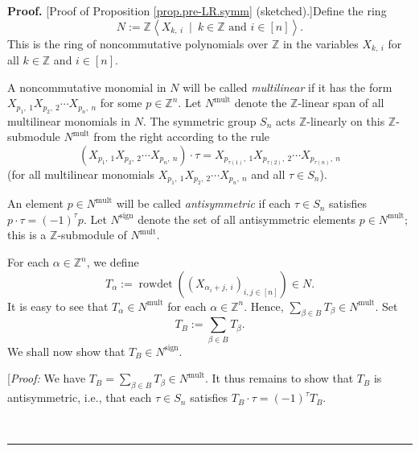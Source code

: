 \documentclass
[numbers=enddot,12pt,final,onecolumn,notitlepage,english]{scrartcl}%
\theoremstyle{definition}
\newenvironment{proof}[1][Proof]{\noindent\textbf{#1.} }{\ \rule{0.5em}{0.5em}}
\let\sumnonlimits\sum
\renewcommand{\sum}{\sumnonlimits\limits}
\begin{document}
\begin{proof}
[Proof of Proposition \ref{prop.pre-LR.symm} (sketched).]Define the ring%
\[
N:=\mathbb{Z}\left\langle X_{k,\ i}\ \mid\ k\in\mathbb{Z}\text{ and }%
i\in\left[  n\right]  \right\rangle .
\]
This is the ring of noncommutative polynomials over $\mathbb{Z}$ in the
variables $X_{k,\ i}$ for all $k\in\mathbb{Z}$ and $i\in\left[  n\right]  $.

A noncommutative monomial in $N$ will be called \emph{multilinear} if it has
the form $X_{p_{1},\ 1}X_{p_{2},\ 2}\cdots X_{p_{n},\ n}$ for some
$p\in\mathbb{Z}^{n}$. Let $N^{\operatorname*{mult}}$ denote the $\mathbb{Z}%
$-linear span of all multilinear monomials in $N$. The symmetric group $S_{n}$
acts $\mathbb{Z}$-linearly on this $\mathbb{Z}$-submodule
$N^{\operatorname*{mult}}$ from the right according to the rule%
\begin{equation}
\left(  X_{p_{1},\ 1}X_{p_{2},\ 2}\cdots X_{p_{n},\ n}\right)  \cdot
\tau=X_{p_{\tau\left(  1\right)  },\ 1}X_{p_{\tau\left(  2\right)  }%
,\ 2}\cdots X_{p_{\tau\left(  n\right)  },\ n}
\label{pf.prop.pre-LR.symm.mon-acn}%
\end{equation}
(for all multilinear monomials $X_{p_{1},\ 1}X_{p_{2},\ 2}\cdots X_{p_{n}%
,\ n}$ and all $\tau\in S_{n}$).

An element $p\in N^{\operatorname*{mult}}$ will be called \emph{antisymmetric}
if each $\tau\in S_{n}$ satisfies $p\cdot\tau=\left(  -1\right)  ^{\tau}p$.
Let $N^{\operatorname*{sign}}$ denote the set of all antisymmetric elements
$p\in N^{\operatorname*{mult}}$; this is a $\mathbb{Z}$-submodule of
$N^{\operatorname*{mult}}$.

For each $\alpha\in\mathbb{Z}^{n}$, we define%
\[
T_{\alpha}:=\operatorname*{rowdet}\left(  \left(  X_{\alpha_{i}+j,\ i}\right)
_{i,j\in\left[  n\right]  }\right)  \in N.
\]
It is easy to see that $T_{\alpha}\in N^{\operatorname*{mult}}$ for each
$\alpha\in\mathbb{Z}^{n}$. Hence, $\sum_{\beta\in B}T_{\beta}\in
N^{\operatorname*{mult}}$. Set%
\begin{equation}
T_{B}:=\sum_{\beta\in B}T_{\beta}. \label{pf.prop.pre-LR.symm.TB=}%
\end{equation}
We shall now show that $T_{B}\in N^{\operatorname*{sign}}$.

[\textit{Proof:} We have $T_{B}=\sum_{\beta\in B}T_{\beta}\in
N^{\operatorname*{mult}}$. It thus remains to show that $T_{B}$ is
antisymmetric, i.e., that each $\tau\in S_{n}$ satisfies $T_{B}\cdot
\tau=\left(  -1\right)  ^{\tau}T_{B}$.


\end{proof}
\end{document}
